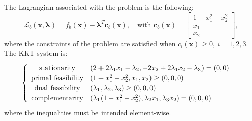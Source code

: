 \documentclass[a4paper,11pt]{article}
\begin{document}
\noindent The Lagrangian associated with the problem is the following:
\begin{equation}
	\mathcal{L}_b(\textbf{x},\boldsymbol{\lambda}) = f_b(\textbf{x}) - \boldsymbol{\lambda}^T \textbf{c}_b(\textbf{x}), \quad \text{with } \textbf{c}_b(\textbf{x}) = \begin{bmatrix}
		1-x_{1}^2 - x_2^2\\
		x_1\\
		x_2
	\end{bmatrix},
\end{equation}
where the constraints of the problem are satisfied when $c_i(\textbf{x})\ge 0,\ i = 1,2,3$. The KKT system is:
\begin{equation}
	\begin{cases}
		\begin{array}{c l}
			\text{stationarity} & (2 + 2\lambda_{1}x_{1} -\lambda_{2}, -2x_{2}+2\lambda_{1}x_{2}-\lambda_{3}) = (0,0) \\
			\text{primal feasibility} &(1 - x_{1}^2 -x_{2}^2, x_{1}, x_{2}) \ge (0,0,0) \\
			\text{dual feasibility} & (\lambda_{1}, \lambda_{2}, \lambda_{3}) \ge (0,0,0) \\
			\text{complementarity} &(\lambda_{1}(1-x_{1}^2-x_{2}^2), \lambda_{2}x_{1}, \lambda_{3}x_{2}) = (0,0,0)
		\end{array}
	\end{cases}
	\label{eq:KKT system f_b}
\end{equation}
where the inequalities must be intended element-wise.\\
\end{document}
